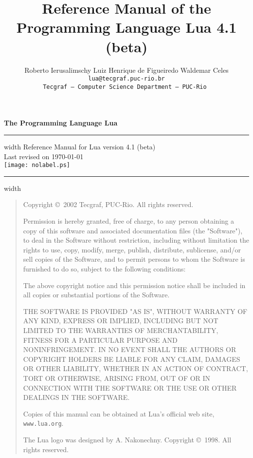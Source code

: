 \documentclass[11pt,twoside,draft]{article}
\def\tecgraf{{\sf Tecgraf}}
\newcommand{\Version}{4.1 (beta)}
\begin{document}
\thispagestyle{empty}
\pagestyle{empty}

{
\parindent=0pt
{\LARGE\bf
The Programming Language Lua}
\hfill
\vskip4pt \hrule height 4pt width \hsize \vskip4pt
\hfill
Reference Manual for Lua version \Version
\\
\null
\hfill
Last revised on \today
\\
\vfill
\centering
\texttt{[image: nolabel.ps]}
\vfill
\vskip4pt \hrule height 2pt width \hsize
}

\newpage
\begin{quotation}
\parskip=10pt
\parindent=0pt
\footnotesize
\null\vfill

\noindent
Copyright \copyright\ 2002 Tecgraf, PUC-Rio.  All rights reserved.

Permission is hereby granted, free of charge,
to any person obtaining a copy of this software
and associated documentation files (the "Software"),
to deal in the Software without restriction,
including without limitation the rights to use, copy, modify,
merge, publish, distribute, sublicense,
and/or sell copies of the Software,
and to permit persons to whom the Software is furnished to do so,
subject to the following conditions:

The above copyright notice and this permission notice shall be
included in all copies or substantial portions of the Software.

THE SOFTWARE IS PROVIDED "AS IS", WITHOUT WARRANTY OF ANY KIND,
EXPRESS OR IMPLIED,
INCLUDING BUT NOT LIMITED TO THE WARRANTIES OF MERCHANTABILITY,
FITNESS FOR A PARTICULAR PURPOSE AND NONINFRINGEMENT.
IN NO EVENT SHALL THE AUTHORS OR COPYRIGHT HOLDERS BE LIABLE
FOR ANY CLAIM, DAMAGES OR OTHER LIABILITY,
WHETHER IN AN ACTION OF CONTRACT, TORT OR OTHERWISE,
ARISING FROM, OUT OF OR IN CONNECTION WITH THE SOFTWARE
OR THE USE OR OTHER DEALINGS IN THE SOFTWARE.


Copies of this manual can be obtained at
Lua's official web site,
\verb|www.lua.org|.

\bigskip
The Lua logo was designed by A. Nakonechny.
Copyright \copyright\ 1998.  All rights reserved.
\end{quotation}
\newpage

\title{\Large\bf Reference Manual of the Programming Language Lua \Version}

\author{%
Roberto Ierusalimschy\qquad
Luiz Henrique de Figueiredo\qquad
Waldemar Celes
\vspace{1.0ex}\\
\smallskip
\small\tt lua@tecgraf.puc-rio.br
\vspace{2.0ex}\\
\tecgraf\ --- Computer Science Department --- PUC-Rio
}
\end{document}

